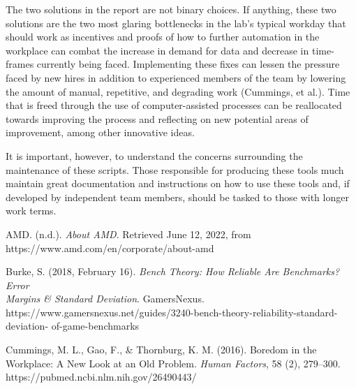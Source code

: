 \documentclass[12pt]{article}
\begin{document}

\indent\hspace{0.5in} The two solutions in the report are not binary choices. If anything, these two solutions are the two most glaring bottlenecks in the lab’s typical workday that should work as incentives and proofs of how to further automation in the workplace can combat the increase in demand for data and decrease in time-frames currently being faced. Implementing these fixes can lessen the pressure faced by new hires in addition to experienced members of the team by lowering the amount of manual, repetitive, and degrading work (Cummings, et al.). Time that is freed through the use of computer-assisted processes can be reallocated towards improving the process and reflecting on new potential areas of improvement, among other innovative ideas.

\indent\hspace{0.5in} It is important, however, to understand the concerns surrounding the maintenance of these scripts. Those responsible for producing these tools much maintain great documentation and instructions on how to use these tools and, if developed by independent team members, should be tasked to those with longer work terms.  





AMD. (n.d.). \emph{About AMD}. Retrieved June 12, 2022, from \\
\indent\hspace{0.5in} https://www.amd.com/en/corporate/about-amd 

Burke, S. (2018, February 16). \emph{Bench Theory: How Reliable Are Benchmarks? Error \\
\indent\hspace{0.5in} Margins \& Standard Deviation}. GamersNexus. \\
\indent\hspace{0.5in} https://www.gamersnexus.net/guides/3240-bench-theory-reliability-standard-deviation-
\indent\hspace{0.5in} of-game-benchmarks

Cummings, M. L., Gao, F., \& Thornburg, K. M. (2016). Boredom in the Workplace: A New 
\indent\hspace{0.5in} Look at an Old Problem. \emph{Human Factors}, 58 (2), 279–300. \\
\indent\hspace{0.5in} https://pubmed.ncbi.nlm.nih.gov/26490443/
\end{document}
